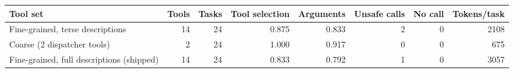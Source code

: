 \begin{tabular}{lrrrrrrr}
\toprule
Tool set & Tools & Tasks & Tool selection & Arguments & Unsafe calls & No call & Tokens/task \\
\midrule
Fine-grained, terse descriptions & 14 & 24 & 0.875 & 0.833 & 2 & 0 & 2108 \\
Coarse (2 dispatcher tools) & 2 & 24 & 1.000 & 0.917 & 0 & 0 & 675 \\
Fine-grained, full descriptions (shipped) & 14 & 24 & 0.833 & 0.792 & 1 & 0 & 3057 \\
\bottomrule
\end{tabular}

